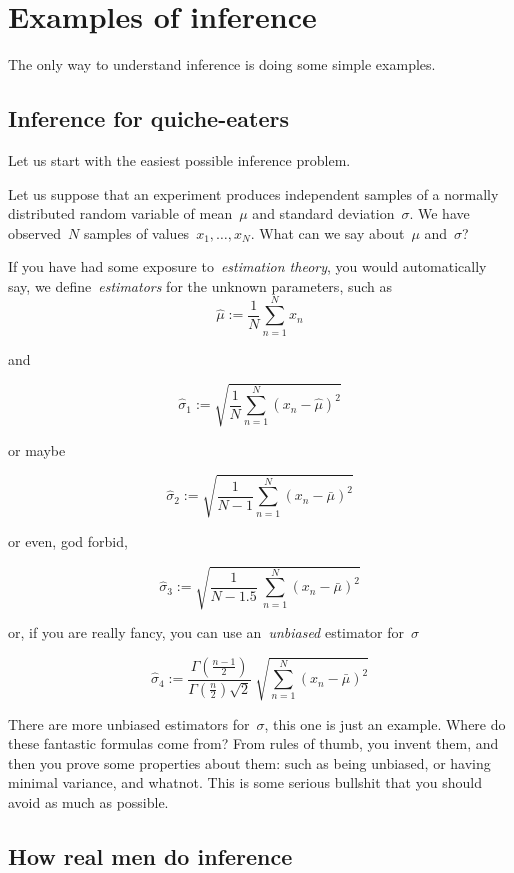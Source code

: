 \section{Examples of inference}

The only way to understand inference is doing some simple examples.

\subsection{Inference for quiche-eaters}

Let us start with the easiest possible inference problem.

Let us suppose that an experiment produces independent samples of a normally
distributed random variable of mean~$\mu$ and standard deviation~$\sigma$.
We have observed~$N$ samples of values~$x_1,\ldots,x_N$.  What can we say
about~$\mu$ and~$\sigma$?

If you have had some exposure to~\emph{estimation theory}, you would
automatically say, we define~\emph{estimators} for the unknown parameters,
such as
$$
\hat\mu :=\frac{1}{N}\sum_{n=1}^N x_n
$$

and

$$
\hat\sigma_1 :=\sqrt{\frac{1}{N}\sum_{n=1}^N (x_n-\hat\mu)^2}
$$

or maybe

$$
\hat\sigma_2 :=\sqrt{\frac{1}{N-1}\sum_{n=1}^N (x_n-\bar\mu)^2}
$$

or even, god forbid,

$$
\hat\sigma_3 :=\sqrt{\frac{1}{N-1.5}\ \sum_{n=1}^N (x_n-\bar\mu)^2}
$$

or, if you are really fancy, you can use an~\emph{unbiased} estimator
for~$\sigma$

$$
\hat\sigma_4
:=\frac{\Gamma\left(\frac{n-1}{2}\right)}{\Gamma\left(\frac{n}{2}\right)\sqrt{2}}\ \sqrt{\sum_{n=1}^N (x_n-\bar\mu)^2}
$$

There are more unbiased estimators for~$\sigma$, this one is just an example.
Where do these fantastic formulas come from?  From rules of thumb, you invent
them, and then you prove some properties about them: such as being unbiased,
or having minimal variance, and whatnot.  This is some serious bullshit that
you should avoid as much as possible.

\subsection{How real men do inference}

